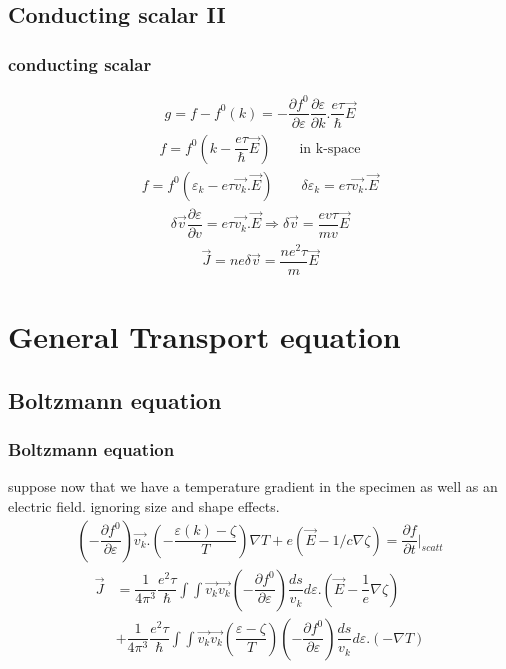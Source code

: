 \documentclass{beamer}
\begin{document}
\subsection{Conducting scalar II}
\begin{frame}
\frametitle{conducting scalar}
\pause
\begin{align*}
g = f - f^0 (k) = -\dfrac{\partial f^0}{\partial \varepsilon} \dfrac{\partial \varepsilon}{\partial k} . \dfrac{e\tau}{\hslash} \vec{E}
\end{align*}
\pause
\begin{align*}
f = f^0 (k-\dfrac{e\tau}{\hslash} \vec{E}) \qquad \text{in k-space}
\end{align*}
\pause
\begin{align*}
f = f^0 (\varepsilon_k - e\tau \vec{v_k}.\vec{E}) \qquad \delta \varepsilon_k =e\tau \vec{v_k}.\vec{E} 
\end{align*}
\pause
\begin{align*}
\delta \vec{v} \dfrac{\partial \varepsilon}{\partial v} =e\tau \vec{v_k}.\vec{E} \Rightarrow \delta \vec{v} =\dfrac{ev\tau}{mv} \vec{E} 
\end{align*}
\pause
\begin{align*}
\vec{J}= ne \delta \vec{v} = \dfrac{ne^2\tau}{m}\vec{E}
\end{align*}
\end{frame}
\section{General Transport equation}
\subsection{Boltzmann equation}
\begin{frame}
\frametitle{Boltzmann equation}
suppose now that we have a temperature gradient in the specimen as well as an electric field. ignoring size and shape effects.
\pause
\begin{align*}
(- \dfrac{\partial f^0}{\partial \varepsilon}) \vec{v_k} . (-\dfrac{\varepsilon (k) - \zeta}{T}) \nabla T + e (\vec{E} - 1/c \nabla \zeta) = \dfrac{\partial f}{\partial t} \big| _{scatt}
\end{align*}
\pause
\begin{align*}
\vec{J} &= \dfrac{1}{4\pi^3} \dfrac{e^2 \tau}{\hslash} \int \int \vec{v_k}\vec{v_k} (- \dfrac{\partial f^0}{\partial \varepsilon}) \dfrac{ds}{v_k} d\varepsilon .(\vec{E} - \dfrac{1}{e} \nabla \zeta)\\
&+ \dfrac{1}{4\pi^3} \dfrac{e^2 \tau}{\hslash} \int \int \vec{v_k}\vec{v_k} (\dfrac{\varepsilon - \zeta}{T})(- \dfrac{\partial f^0}{\partial \varepsilon}) \dfrac{ds}{v_k} d\varepsilon .(-\nabla T)
\end{align*}
\end{frame}
\end{document}
